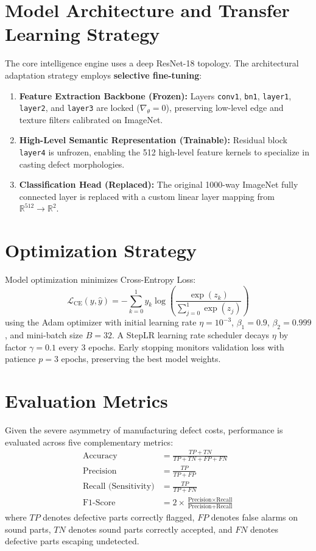 \documentclass[12pt,a4paper]{report}
\begin{document}
\section{Model Architecture and Transfer Learning Strategy}
The core intelligence engine uses a deep ResNet-18 topology. The architectural adaptation strategy employs \textbf{selective fine-tuning}:
\begin{enumerate}
    \item \textbf{Feature Extraction Backbone (Frozen):} Layers \texttt{conv1}, \texttt{bn1}, \texttt{layer1}, \texttt{layer2}, and \texttt{layer3} are locked ($\nabla_\theta = 0$), preserving low-level edge and texture filters calibrated on ImageNet.
    \item \textbf{High-Level Semantic Representation (Trainable):} Residual block \texttt{layer4} is unfrozen, enabling the 512 high-level feature kernels to specialize in casting defect morphologies.
    \item \textbf{Classification Head (Replaced):} The original 1000-way ImageNet fully connected layer is replaced with a custom linear layer mapping from $\mathbb{R}^{512} \to \mathbb{R}^2$.
\end{enumerate}

\section{Optimization Strategy}
Model optimization minimizes Cross-Entropy Loss:
\begin{equation}
    \mathcal{L}_{\text{CE}}(y, \hat{y}) = - \sum_{k=0}^{1} y_k \log \left( \frac{\exp(z_k)}{\sum_{j=0}^{1} \exp(z_j)} \right)
\end{equation}
using the Adam optimizer \cite{kingma2015adam} with initial learning rate $\eta = 10^{-3}$, $\beta_1 = 0.9$, $\beta_2 = 0.999$, and mini-batch size $B = 32$. A StepLR learning rate scheduler decays $\eta$ by factor $\gamma = 0.1$ every 3 epochs. Early stopping monitors validation loss with patience $p=3$ epochs, preserving the best model weights.

\section{Evaluation Metrics}
Given the severe asymmetry of manufacturing defect costs, performance is evaluated across five complementary metrics:
\begin{align}
    \text{Accuracy} &= \frac{TP + TN}{TP + TN + FP + FN} \\[0.2cm]
    \text{Precision} &= \frac{TP}{TP + FP} \\[0.2cm]
    \text{Recall (Sensitivity)} &= \frac{TP}{TP + FN} \\[0.2cm]
    \text{F1-Score} &= 2 \times \frac{\text{Precision} \times \text{Recall}}{\text{Precision} + \text{Recall}}
\end{align}
where $TP$ denotes defective parts correctly flagged, $FP$ denotes false alarms on sound parts, $TN$ denotes sound parts correctly accepted, and $FN$ denotes defective parts escaping undetected.
\end{document}
